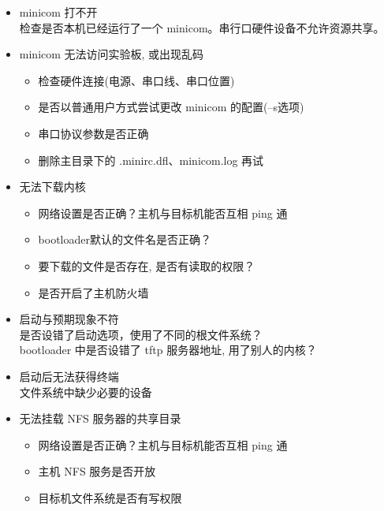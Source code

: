 \begin{itemize}
  \item minicom 打不开\\
		检查是否本机已经运行了一个 minicom。串行口硬件设备不允许资源共享。
  \item minicom 无法访问实验板, 或出现乱码
  \begin{itemize}
	\item 检查硬件连接(电源、串口线、串口位置)
	\item 是否以普通用户方式尝试更改 minicom 的配置(--s选项)
	\item 串口协议参数是否正确
	\item 删除主目录下的 .minirc.dfl、minicom.log 再试
  \end{itemize}
\end{itemize}
\endslide

\begin{itemize}
  \item 无法下载内核
  \begin{itemize}
	\item 网络设置是否正确？主机与目标机能否互相 ping 通
	\item bootloader默认的文件名是否正确？
	\item 要下载的文件是否存在, 是否有读取的权限？
	\item 是否开启了主机防火墙
\end{itemize}
\end{itemize}
\endslide

\begin{itemize}
  \item 启动与预期现象不符\\
		是否设错了启动选项，使用了不同的根文件系统？\\
		bootloader 中是否设错了 tftp 服务器地址, 用了别人的内核？
  \item 启动后无法获得终端\\
		文件系统中缺少必要的设备
  \item 无法挂载 NFS 服务器的共享目录
  \begin{itemize}
	\item 网络设置是否正确？主机与目标机能否互相 ping 通
	\item 主机 NFS 服务是否开放
	\item 目标机文件系统是否有写权限
  \end{itemize}
\end{itemize}
\endslide


